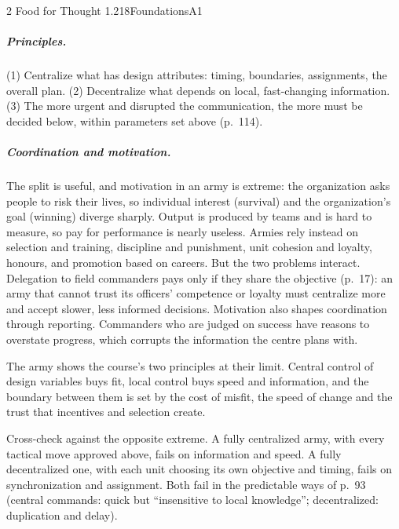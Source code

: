 \begin{exsol}{2}{\MR{} Food for Thought 1.2}{18}{Foundations}{A1}
\subparagraph{Principles.} (1) Centralize what has design attributes: timing, boundaries,
assignments, the overall plan. (2) Decentralize what depends on local, fast-changing information.
(3) The more urgent and disrupted the communication, the more must be decided below, within
parameters set above (p.~114).

\subparagraph{Coordination and motivation.} The split is useful, and motivation in an army is
extreme: the organization asks people to risk their lives, so individual interest (survival)
and the organization's goal (winning) diverge sharply. Output is produced by teams and is hard to
measure, so pay for performance is nearly useless. Armies rely instead on selection and training,
discipline and punishment, unit cohesion and loyalty, honours, and promotion based on careers. But
the two problems interact. Delegation to field commanders pays only if they share the objective
(p.~17): an army that cannot trust its officers' competence or loyalty must centralize more and
accept slower, less informed decisions. Motivation also shapes coordination through reporting.
Commanders who are judged on success have reasons to overstate progress, which corrupts the
information the centre plans with.

\interp The army shows the course's two principles at their limit. Central control of design
variables buys fit, local control buys speed and information, and the boundary between them is set
by the cost of misfit, the speed of change and the trust that incentives and selection create.

\verify Cross-check against the opposite extreme. A fully centralized army, with every tactical
move approved above, fails on information and speed. A fully decentralized one, with each unit
choosing its own objective and timing, fails on synchronization and assignment. Both fail in the
predictable ways of p.~93 (central commands: quick but ``insensitive to local knowledge'';
decentralized: duplication and delay).

\end{exsol}
